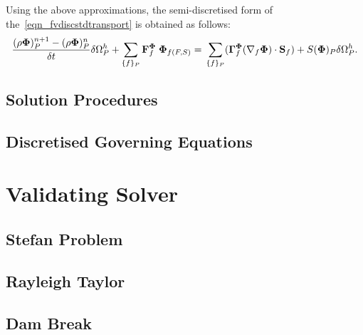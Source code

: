 Using the above approximations, the semi-discretised form of the~\ref{eqn_fvdiscstdtransport} is obtained as follows:
\begin{equation}\label{eqn_semidiscrete}
    \frac{(\mathbf{\rho\Phi})_{P}^{n+1} - (\mathbf{\rho\Phi})_{P}^{n}}{\delta t} \delta\Omega^{h}_{P} + \sum_{\{f\}_{P}} \mathbf{F}^{\mathbf{\Phi}}_{f} \;\mathbf{\Phi}_{f(F,S)} =\\
    \sum_{\{f\}_{P}} (\mathbf{\Gamma}^{\mathbf{\Phi}}_{f} (\nabla_{f}\mathbf{\Phi}) \cdot \mathbf{S}_{f}) + S(\mathbf{\Phi})_{P}\delta\Omega^{h}_{P}.
\end{equation}
\subsection{Solution Procedures}
\subsection{Discretised Governing Equations}

\section{Validating Solver}
\subsection{Stefan Problem}
\subsection{Rayleigh Taylor}
\subsection{Dam Break}






